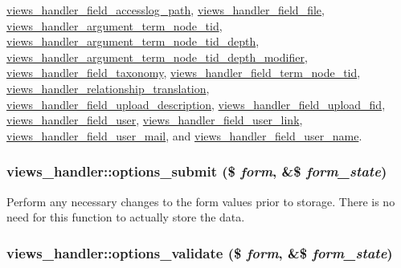 \hyperlink{classviews__handler__field__accesslog__path_b8bfda464a205057cd730081aa5981c8}{views\_\-handler\_\-field\_\-accesslog\_\-path}, \hyperlink{classviews__handler__field__file_ab95242357e45be9c4fbbced1f625d7b}{views\_\-handler\_\-field\_\-file}, \hyperlink{classviews__handler__argument__term__node__tid_f00552a1378333434154989c051d0e98}{views\_\-handler\_\-argument\_\-term\_\-node\_\-tid}, \hyperlink{classviews__handler__argument__term__node__tid__depth_db15b091303182e330a162d384676e50}{views\_\-handler\_\-argument\_\-term\_\-node\_\-tid\_\-depth}, \hyperlink{classviews__handler__argument__term__node__tid__depth__modifier_a4796e763923377f41dbf9bf415d96e8}{views\_\-handler\_\-argument\_\-term\_\-node\_\-tid\_\-depth\_\-modifier}, \hyperlink{classviews__handler__field__taxonomy_df66d3026b9409dd3237c5ebef994595}{views\_\-handler\_\-field\_\-taxonomy}, \hyperlink{classviews__handler__field__term__node__tid_0f0641c036e0a2498abd497cba1161a5}{views\_\-handler\_\-field\_\-term\_\-node\_\-tid}, \hyperlink{classviews__handler__relationship__translation_ca4668f3619b0fc6182e12cbaf38b633}{views\_\-handler\_\-relationship\_\-translation}, \hyperlink{classviews__handler__field__upload__description_714cc6455e6fa7c9426dcf08dee9f89e}{views\_\-handler\_\-field\_\-upload\_\-description}, \hyperlink{classviews__handler__field__upload__fid_b39479eb80cfba952037f37e930d1b6e}{views\_\-handler\_\-field\_\-upload\_\-fid}, \hyperlink{classviews__handler__field__user_ecf77682fa7dc9daf1fa97cbe045420d}{views\_\-handler\_\-field\_\-user}, \hyperlink{classviews__handler__field__user__link_952944015feaaab1fb2d0abc29d5c2b5}{views\_\-handler\_\-field\_\-user\_\-link}, \hyperlink{classviews__handler__field__user__mail_ee55735f96178173853dbf1f8b293216}{views\_\-handler\_\-field\_\-user\_\-mail}, and \hyperlink{classviews__handler__field__user__name_0c3b7db3d060e384287fa62f348c9387}{views\_\-handler\_\-field\_\-user\_\-name}.\hypertarget{classviews__handler_583187975f1bbf5df13138a0898f2ac7}{
\subsubsection[{options\_\-submit}]{\setlength{\rightskip}{0pt plus 5cm}views\_\-handler::options\_\-submit (\$ {\em form}, \/  \&\$ {\em form\_\-state})}}
\label{classviews__handler_583187975f1bbf5df13138a0898f2ac7}


Perform any necessary changes to the form values prior to storage. There is no need for this function to actually store the data. \hypertarget{classviews__handler_48a7b56e8952d9fcf56e2dec7794bb4e}{
\subsubsection[{options\_\-validate}]{\setlength{\rightskip}{0pt plus 5cm}views\_\-handler::options\_\-validate (\$ {\em form}, \/  \&\$ {\em form\_\-state})}}
\label{classviews__handler_48a7b56e8952d9fcf56e2dec7794bb4e}



